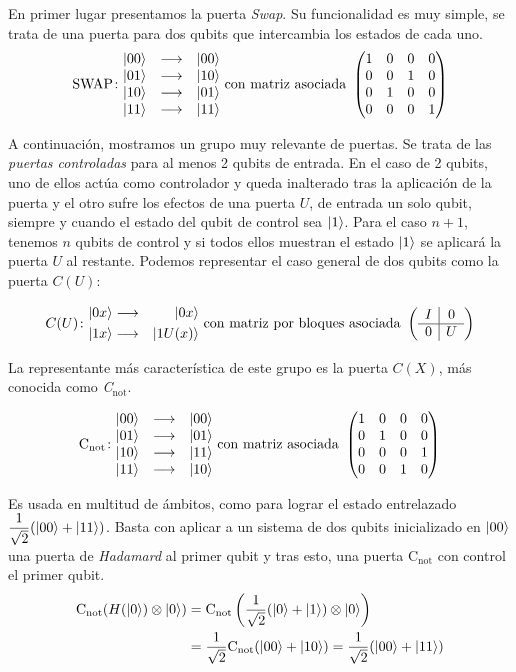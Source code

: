 En primer lugar presentamos la puerta \textit{Swap}. Su funcionalidad es muy simple, se trata de una puerta para dos qubits que intercambia los estados de cada uno.
\[\gatefour{\mathrm{SWAP}}{\ket{00}}{\ket{10}}{\ket{01}}{\ket{11}}\mathrm{\ con\ matriz\ asociada\ }\left(\begin{matrix}1&0&0&0\\0&0&1&0\\0&1&0&0\\0&0&0&1\end{matrix}\right)\]

A continuación, mostramos un grupo muy relevante de puertas. Se trata de las \textit{puertas controladas} para al menos 2 qubits de entrada. En el caso de 2 qubits, uno de ellos actúa como controlador y queda inalterado tras la aplicación de la puerta y el otro sufre los efectos de una puerta $U$, de entrada un solo qubit, siempre y cuando el estado del qubit de control sea $\left|1\right\rangle$. Para el caso $n+1$, tenemos $n$ qubits de control y si todos ellos muestran el estado $\left|1\right\rangle$ se aplicará la puerta $U$ al restante. Podemos representar el caso general de dos qubits como la puerta $C(U)$:

\[C(U)\colon \begin{aligned}\ket{0x}&\longrightarrow&\ket{0x}\\\ket{1x}&\longrightarrow&\ket{1U(x)}\end{aligned} \mathrm{\ con\ matriz\ por\ bloques\ asociada\ }\left(\begin{array}{c|c}I&0\\\hline0&U\end{array}\right)\]

La representante más característica de este grupo es la puerta $C(X)$, más conocida como \textit{C$_\textrm{not}$}.

\[\gatefour{\mathrm{C_{not}}}{\ket{00}}{\ket{01}}{\ket{11}}{\ket{10}}\mathrm{\ con\ matriz\ asociada\ }\left(\begin{matrix}1&0&0&0\\0&1&0&0\\0&0&0&1\\0&0&1&0\end{matrix}\right)\]

Es usada en multitud de ámbitos, como para lograr el estado entrelazado $\dfrac{1}{\sqrt{2}}(\left|00\right\rangle+\left|11\right\rangle)$. Basta con aplicar a un sistema de dos qubits inicializado en $\left|00\right\rangle$ una puerta de \textit{Hadamard} al primer qubit y tras esto, una puerta C$_\textrm{not}$ con control el primer qubit.
\begin{equation}
\begin{split}
\mathrm{C_{not}}(H(\left|0\right\rangle)\otimes\left|0\right\rangle)&=\mathrm{C_{not}}\left(\dfrac{1}{\sqrt{2}}(\left|0\right\rangle+\left|1\right\rangle)\otimes\left|0\right\rangle\right)\\
&=\dfrac{1}{\sqrt{2}}\mathrm{C_{not}}(\left|00\right\rangle+\left|10\right\rangle)=\dfrac{1}{\sqrt{2}}(\left|00\right\rangle+\left|11\right\rangle)
\end{split}
\end{equation}

